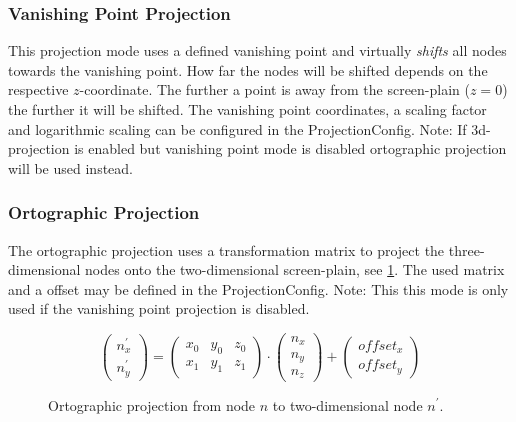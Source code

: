 \subsubsection{Vanishing Point Projection}
This projection mode uses a defined vanishing point and virtually \emph{shifts} all nodes towards the vanishing point. How far the nodes will be shifted depends on the respective $z$-coordinate. The further a point is away from the screen-plain ($z=0$) the further it will be shifted. The vanishing point coordinates, a scaling factor and logarithmic scaling can be configured in the ProjectionConfig. Note: If 3d-projection is enabled but vanishing point mode is disabled ortographic projection will be used instead.

\subsubsection{Ortographic Projection}
The ortographic projection uses a transformation matrix to project the three-dimensional nodes onto the two-dimensional screen-plain, see \ref{math:orthographicProjection}. The used matrix and a offset may be defined in the ProjectionConfig. Note: This this mode is only used if the vanishing point projection is disabled.

\begin{figure} [h]
\[
\left(
\begin{array}{c}
n_{x}^{'} \\
n_{y}^{'}
\end{array}
\right)
%
=
%
\left(
\begin{array}{ccc}
x_0 & y_0 & z_0 \\
x_1 & y_1 & z_1
\end{array}
\right)
\cdot
\left(
\begin{array}{c}
n_x  \\
n_y  \\
n_z
\end{array}
\right)
%
+
%
\left(
\begin{array}{c}
offset_x \\
offset_y
\end{array}
\right)
\]
\caption{Ortographic projection from node $n$ to two-dimensional node $n^{'}$.}
\label{math:orthographicProjection}
\end{figure}

